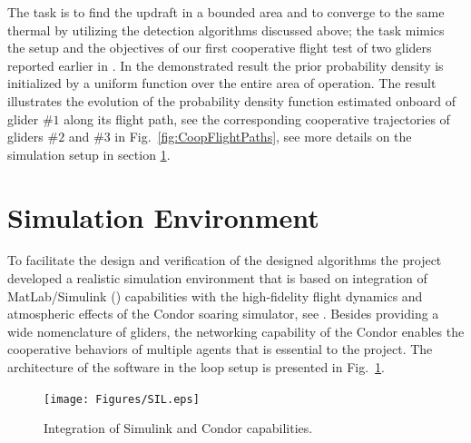 \documentclass{ifacconf}
\newcommand{\squeezeup}{\vspace{-3.0mm}}
\begin{document}
The task is to find the updraft in a bounded area and to converge to the same
thermal by utilizing the detection algorithms discussed above; the task
mimics the setup and the objectives of our first cooperative flight test of
two gliders reported earlier in \cite{AKlass_JGCD:2012}. In the demonstrated
result the prior probability density is initialized by a uniform function
over the entire area of operation. The result illustrates the evolution of
the probability density function estimated onboard of glider $\#1$ along its
flight path, see the corresponding cooperative trajectories of gliders $\#2$
and $\#3$ in Fig.~\ref{fig:CoopFlightPaths}, see more details on the
simulation setup in section \ref{sec:SimEnv}.\squeezeup

\section{Simulation Environment}
\label{sec:SimEnv}
\squeezeup

To facilitate the design and verification of the designed algorithms the
project developed a realistic simulation environment that is based on
integration of MatLab/Simulink (\cite{MATLAB:2013}) capabilities with the
high-fidelity flight dynamics and atmospheric effects of the Condor soaring
simulator, see \cite{Condor:2013:Online}. Besides providing a wide
nomenclature of gliders, the networking capability of the Condor enables the
cooperative behaviors of multiple agents that is essential to the project.
The architecture of the software in the loop setup is presented in
Fig.~\ref{fig:SIL}.
%

\begin{figure}[thpb]
  \centering
  \texttt{[image: Figures/SIL.eps]}
  \caption{Integration of Simulink and Condor capabilities.}
  \label{fig:SIL}
\end{figure}
\end{document}
